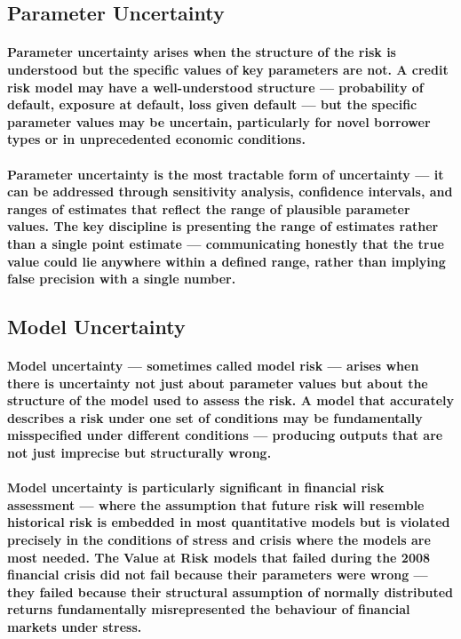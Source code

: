 \subsection{Parameter Uncertainty}
\paragraph{\textbf{Parameter uncertainty} arises when the structure of the risk is understood but the specific values of key parameters are not. A credit risk model may have a well-understood structure — probability of default, exposure at default, loss given default — but the specific parameter values may be uncertain, particularly for novel borrower types or in unprecedented economic conditions.}
\paragraph{Parameter uncertainty is the most tractable form of uncertainty — it can be addressed through sensitivity analysis, confidence intervals, and ranges of estimates that reflect the range of plausible parameter values. The key discipline is presenting the range of estimates rather than a single point estimate — communicating honestly that the true value could lie anywhere within a defined range, rather than implying false precision with a single number.}

\subsection{Model Uncertainty}
\paragraph{\textbf{Model uncertainty} — sometimes called model risk — arises when there is uncertainty not just about parameter values but about the structure of the model used to assess the risk. A model that accurately describes a risk under one set of conditions may be fundamentally misspecified under different conditions — producing outputs that are not just imprecise but structurally wrong.}
\paragraph{Model uncertainty is particularly significant in financial risk assessment — where the assumption that future risk will resemble historical risk is embedded in most quantitative models but is violated precisely in the conditions of stress and crisis where the models are most needed. The Value at Risk models that failed during the 2008 financial crisis did not fail because their parameters were wrong — they failed because their structural assumption of normally distributed returns fundamentally misrepresented the behaviour of financial markets under stress.}
